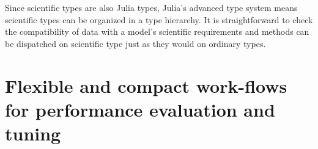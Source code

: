 \documentclass{article}
\begin{document}



Since scientific types are also Julia types, Julia's advanced type
system means scientific types can be organized in a type hierarchy.
It is straightforward to check the compatibility of data with a
model's scientific requirements and methods can be dispatched on
scientific type just as they would on ordinary types.





\section{Flexible and compact work-flows for performance evaluation and tuning}
\end{document}
